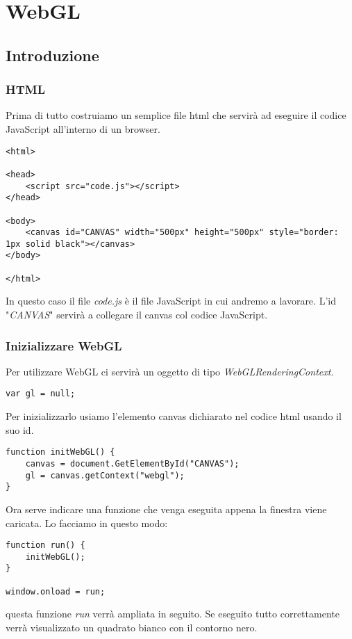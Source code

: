 
\chapter{WebGL}
\section{Introduzione}
\subsection{HTML}
Prima di tutto costruiamo un semplice file html che servir\`a ad eseguire il codice JavaScript
all'interno di un browser.
\begin{lstlisting}[style=html5-style]
<html>

<head>
	<script src="code.js"></script>
</head>

<body>
	<canvas id="CANVAS" width="500px" height="500px" style="border: 1px solid black"></canvas>
</body>

</html>
\end{lstlisting}
In questo caso il file \emph{code.js} \`e il file JavaScript in cui andremo a lavorare.
L'id "\emph{CANVAS}" servir\`a a collegare il canvas col codice JavaScript.

\subsection{Inizializzare WebGL}
Per utilizzare WebGL ci servir\`a un oggetto di tipo \emph{WebGLRenderingContext}.
\begin{lstlisting}[style=javascript-style]
var gl = null;
\end{lstlisting}
Per inizializzarlo usiamo l'elemento canvas dichiarato nel codice html usando il suo id.
\begin{lstlisting}[style=javascript-style, firstnumber=2]
function initWebGL() {
	canvas = document.GetElementById("CANVAS");
	gl = canvas.getContext("webgl");
}
\end{lstlisting}
Ora serve indicare una funzione che venga eseguita appena la finestra viene caricata. Lo
facciamo in questo modo:
\begin{lstlisting}[style=javascript-style, firstnumber=6]
function run() {
	initWebGL();
}

window.onload = run;
\end{lstlisting}
questa funzione \emph{run} verr\`a ampliata in seguito.
Se eseguito tutto correttamente verr\`a visualizzato un quadrato bianco con il contorno nero.

